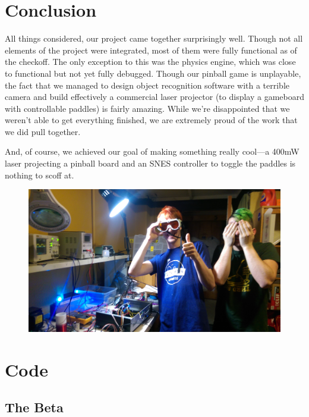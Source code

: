 \documentclass{article}
\begin{document}
\section{Conclusion}
All things considered, our project came together surprisingly well. Though not all elements of the project were integrated, most of them were fully functional as of the checkoff. The only exception to this was the physics engine, which was close to functional but not yet fully debugged. Though our pinball game is unplayable, the fact that we managed to design object recognition software with a terrible camera and build effectively a commercial laser projector (to display a gameboard with controllable paddles) is fairly amazing. While we're disappointed that we weren't able to get everything finished, we are extremely proud of the work that we did pull together.

And, of course, we achieved our goal of making something really cool---a 400mW laser projecting a pinball board and an SNES controller to toggle the paddles is nothing to scoff at.

\begin{figure}[H]
\centering
\includegraphics[width=\textwidth]{safety}
\end{figure}

\pagebreak
\glsaddall
\printglossary
\pagebreak
\section{Code}
\subsection{The Beta}
\end{document}
